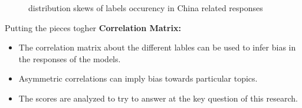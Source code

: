 \documentclass{beamer}
\begin{document}
\begin{frame}
\begin{figure}[H]
    
    \caption{distribution skews of labels occurency in China related responses}
\end{figure}
\end{frame}

\begin{frame}{Putting the pieces togher}
    \textbf{Correlation Matrix:}
    \begin{itemize}
        \item The correlation matrix about the different lables can be used to infer bias in the responses of the models.
        \item Asymmetric correlations can imply bias towards particular topics.
        \item The scores are analyzed to try to answer at the key question of this research.
    \end{itemize}
\end{frame}
\end{document}

